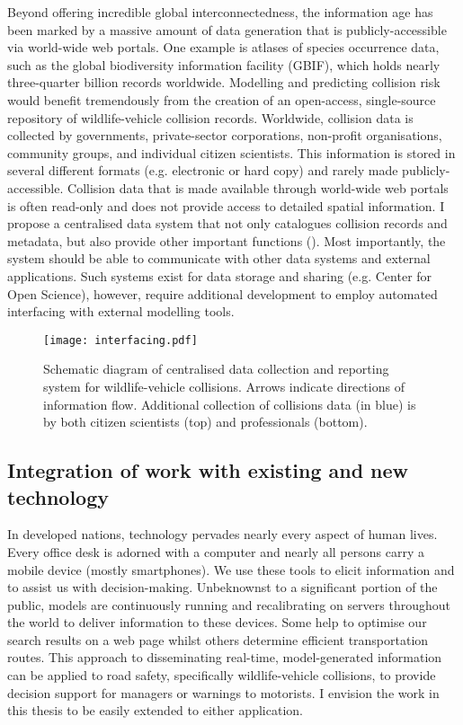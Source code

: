 Beyond offering incredible global interconnectedness, the information age has been marked by a massive amount of data generation that is publicly-accessible via world-wide web portals. One example is atlases of species occurrence data, such as the global biodiversity information facility (GBIF), which holds nearly three-quarter billion records worldwide. Modelling and predicting collision risk would benefit tremendously from the creation of an open-access, single-source repository of wildlife-vehicle collision records. Worldwide, collision data is collected by governments, private-sector corporations, non-profit organisations, community groups, and individual citizen scientists. This information is stored in several different formats (e.g. electronic or hard copy) and rarely made publicly-accessible. Collision data that is made available through world-wide web portals is often read-only and does not provide access to detailed spatial information. I propose a centralised data system that not only catalogues collision records and metadata, but also provide other important functions (). Most importantly, the system should be able to communicate with other data systems and external applications. Such systems exist for data storage and sharing (e.g. Center for Open Science), however, require additional development to employ automated interfacing with external modelling tools.

\begin{figure*}[!t]
  \centering
  \texttt{[image: interfacing.pdf]}
  \caption[Centralised data collection and reporting system]{Schematic diagram of centralised data collection and reporting system for wildlife-vehicle collisions. Arrows indicate directions of information flow. Additional collection of collisions data (in blue) is by both citizen scientists (top) and professionals (bottom).}
  \label{wvc_server}
\end{figure*}

\subsection{Integration of work with existing and new technology}

In developed nations, technology pervades nearly every aspect of human lives. Every office desk is adorned with a computer and nearly all persons carry a mobile device (mostly smartphones). We use these tools to elicit information and to assist us with decision-making. Unbeknownst to a significant portion of the public, models are continuously running and recalibrating on servers throughout the world to deliver information to these devices. Some help to optimise our search results on a web page whilst others determine efficient transportation routes. This approach to disseminating real-time, model-generated information can be applied to road safety, specifically wildlife-vehicle collisions, to provide decision support for managers or warnings to motorists. I envision the work in this thesis to be easily extended to either application.

